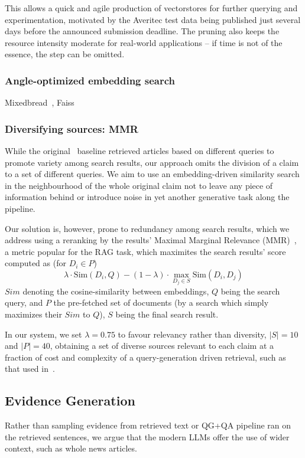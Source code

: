 This allows a quick and agile production of vectorstores for further querying and experimentation, motivated by the Averitec test data being published just several days before the announced submission deadline.
The pruning also keeps the resource intensity moderate for real-world applications -- if time is not of the essence, the step can be omitted.

\subsubsection{Angle-optimized embedding search}
\label{sec:knn}
Mixedbread~\cite{li-li-2024-aoe,emb2024mxbai}, Faiss~\cite{douze2024faiss,johnson2019billion}

\subsubsection{Diversifying sources: MMR}
While the original~\cite{averitec2024} baseline retrieved articles based on different queries to promote variety among search results, our approach omits the division of a claim to a set of different queries.
We aim to use an embedding-driven similarity search in the neighbourhood of the whole original claim not to leave any piece of information behind or introduce noise in yet another generative task along the pipeline.

Our solution is, however, prone to redundancy among search results, which we address using a reranking by the results' Maximal Marginal Relevance (MMR)~\cite{carbonell-mmr}, a metric popular for the RAG task, which maximites the search results' score computed as (for $D_i\in P$)
$$\lambda \cdot \mathrm{Sim}(D_i, Q) - (1-\lambda) \cdot \max_{D_j \in S} \mathrm{Sim}(D_i, D_j)$$
$Sim$ denoting the cosine-similarity between embeddings, $Q$ being the search query, and $P$ the pre-fetched set of documents (by a search which simply maximizes their $Sim$ to $Q$), $S$ being the final search result.

In our system, we set $\lambda=0.75$ to favour relevancy rather than diversity, $|S|=10$ and $|P| = 40$, obtaining a set of diverse sources relevant to each claim at a fraction of cost and complexity of a query-generation driven retrieval, such as that used in~\cite{averitec2024}.

\subsection{Evidence Generation}
Rather than sampling evidence from retrieved text or QG+QA pipeline ran on the retrieved sentences, we argue that the modern LLMs offer the use of wider context, such as whole news articles.

